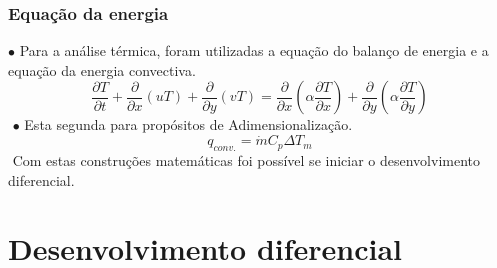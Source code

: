 \documentclass[xcolor=dvipsnames,10pt,aspectratio=169]{beamer}
\begin{document}
	
		\begin{frame}
			\frametitle{Equação da energia}
		$\bullet$ Para a análise térmica, foram utilizadas a equação do balanço de energia e a equação da energia convectiva.
		\begin{equation}
		\frac{\partial T}{\partial t} + {\frac{\partial{}}{\partial{x}} (uT)} + 
		{\frac{\partial{}}{\partial{y}} (vT)} 
		=
		{\frac{\partial{}}{\partial{x}}} \left(\alpha {\frac{\partial{T}}{\partial{x}}} \right) +
		{\frac{\partial{}}{\partial{y}}} \left(\alpha {\frac{\partial{T}}{\partial{y}}} \right) 
		\end{equation}
		$ $
		$\bullet$ Esta segunda para propósitos de Adimensionalização.
		\begin{equation}\label{c_h_e}
		q_{conv.} = \dot{m} C_p \Delta T_m
		\end{equation}
		$ $
		Com estas construções matemáticas foi possível se iniciar o desenvolvimento diferencial.
		\end{frame}
	
	
	
	
	
	\section{Desenvolvimento diferencial}
		
		
		
		
		
\end{document}
